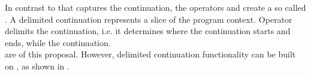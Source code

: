 In contrast to \cc that captures the  continuation, the
operators \shift and \reset create a so called . A
delimited continuation represents a slice of the program context. Operator
\reset delimits the continuation, i.e. it determines where the continuation
starts and ends, while \shift {} the continuation.\\
 are  of this proposal. However,
delimited continuation functionality can be built on \cc, as shown in
.

